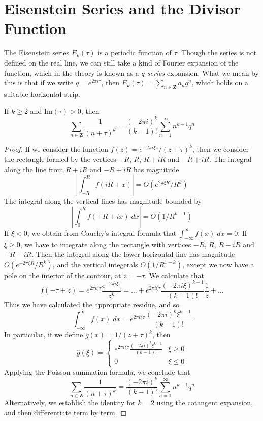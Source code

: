 \section{Eisenstein Series and the Divisor Function}

The Eisenstein series $E_k(\tau)$ is a periodic function of $\tau$. Though the series is not defined on the real line, we can still take a kind of Fourier expansion of the function, which in the theory is known as a {\it $q$ series} expansion. What we mean by this is that if we write $q = e^{2 \pi i \tau}$, then $E_k(\tau) = \sum_{n \in \mathbf{Z}} a_n q^n$, which holds on a suitable horizontal strip.

\begin{lemma}
    If $k \geq 2$ and $\text{Im}(\tau) > 0$, then
    \[ \sum_{n \in \mathbf{Z}} \frac{1}{(n + \tau)^k} = \frac{(-2\pi i)^k}{(k - 1)!} \sum_{n = 1}^\infty n^{k-1} q^n \]
\end{lemma}
\begin{proof}
    If we consider the function $f(z) = e^{-2 \pi i \xi z}/(z + \tau)^k$, then we consider the rectangle formed by the vertices $-R$, $R$, $R+iR$ and $-R+iR$. The integral along the line from $R + iR$ and $-R + iR$ has magnitude
    \[ \left| \int_{-R}^R f(iR + x) \right| = O \left( e^{2 \pi \xi R}/R^k \right) \]
    The integral along the vertical lines has magnitude bounded by
    \[ \left| \int_0^R f(\pm R + ix)\; dx \right| = O(1/R^{k-1}) \]
    If $\xi < 0$, we obtain from Cauchy's integral formula that $\int_{-\infty}^\infty f(x)\; dx = 0$. If $\xi \geq 0$, we have to integrate along the rectangle with vertices $-R$, $R$, $R-iR$ and $-R-iR$. Then the integral along the lower horizontal line has magnitude $O(e^{- 2 \pi \xi R}/R^k)$, and the vertical integerals $O(1/R^{1-k})$, except we now have a pole on the interior of the contour, at $z = - \tau$. We calculate that
    \[ f(-\tau + z) = e^{2 \pi i \xi \tau} \frac{e^{- 2 \pi i \xi z}}{z^k} = \dots + e^{2 \pi i \xi \tau} \frac{(-2 \pi i \xi)^{k-1}}{(k-1)!} \frac{1}{z} + \dots \]
    Thus we have calculated the appropriate residue, and so
    \[ \int_{-\infty}^\infty f(x)\; dx = e^{2 \pi i \xi \tau} \frac{(- 2 \pi i)^k \xi^{k-1}}{(k-1)!} \]
    In particular, if we define $g(x) = 1/(z + \tau)^k$, then
    \[ \widehat{g}(\xi) = \begin{cases} e^{2 \pi i \xi \tau} \frac{(-2 \pi i)^k \xi^{k-1}}{(k-1)!} & \xi \geq 0 \\ 0 & \xi \leq 0 \end{cases} \]
    Applying the Poisson summation formula, we conclude that
    \[ \sum_{n \in \mathbf{Z}} \frac{1}{(n + \tau)^k} = \frac{(- 2 \pi i)^k}{(k-1)!} \sum_{n = 1}^\infty n^{k-1} q^n \]
    Alternatively, we establish the identity for $k = 2$ using the cotangent expansion, and then differentiate term by term.
\end{proof}

